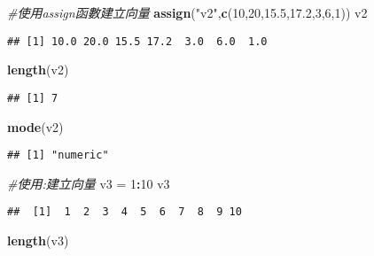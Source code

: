 \documentclass[
]{article}
\newenvironment{Shaded}{\begin{snugshade}}{\end{snugshade}}
\newcommand{\CommentTok}[1]{\textcolor[rgb]{0.56,0.35,0.01}{\textit{#1}}}
\newcommand{\DecValTok}[1]{\textcolor[rgb]{0.00,0.00,0.81}{#1}}
\newcommand{\FloatTok}[1]{\textcolor[rgb]{0.00,0.00,0.81}{#1}}
\newcommand{\KeywordTok}[1]{\textcolor[rgb]{0.13,0.29,0.53}{\textbf{#1}}}
\newcommand{\NormalTok}[1]{#1}
\newcommand{\OperatorTok}[1]{\textcolor[rgb]{0.81,0.36,0.00}{\textbf{#1}}}
\newcommand{\StringTok}[1]{\textcolor[rgb]{0.31,0.60,0.02}{#1}}
\begin{document}
\begin{Shaded}
\begin{Highlighting}[]
\CommentTok{#使用assign函數建立向量}
\KeywordTok{assign}\NormalTok{(}\StringTok{"v2"}\NormalTok{,}\KeywordTok{c}\NormalTok{(}\DecValTok{10}\NormalTok{,}\DecValTok{20}\NormalTok{,}\FloatTok{15.5}\NormalTok{,}\FloatTok{17.2}\NormalTok{,}\DecValTok{3}\NormalTok{,}\DecValTok{6}\NormalTok{,}\DecValTok{1}\NormalTok{))}
\NormalTok{v2}
\end{Highlighting}
\end{Shaded}

\begin{verbatim}
## [1] 10.0 20.0 15.5 17.2  3.0  6.0  1.0
\end{verbatim}

\begin{Shaded}
\begin{Highlighting}[]
\KeywordTok{length}\NormalTok{(v2)}
\end{Highlighting}
\end{Shaded}

\begin{verbatim}
## [1] 7
\end{verbatim}

\begin{Shaded}
\begin{Highlighting}[]
\KeywordTok{mode}\NormalTok{(v2)}
\end{Highlighting}
\end{Shaded}

\begin{verbatim}
## [1] "numeric"
\end{verbatim}

\begin{Shaded}
\begin{Highlighting}[]
\CommentTok{#使用:建立向量}
\NormalTok{v3 =}\StringTok{ }\DecValTok{1}\OperatorTok{:}\DecValTok{10}
\NormalTok{v3}
\end{Highlighting}
\end{Shaded}

\begin{verbatim}
##  [1]  1  2  3  4  5  6  7  8  9 10
\end{verbatim}

\begin{Shaded}
\begin{Highlighting}[]
\KeywordTok{length}\NormalTok{(v3)}
\end{Highlighting}
\end{Shaded}
\end{document}

